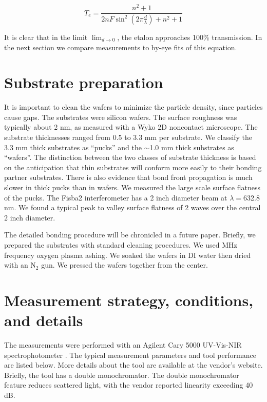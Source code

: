 \documentclass[osajnl,preprint,showpacs,superscriptaddress,12pt]{revtex4-1} %
\begin{document}
$$T_{e} = \frac{n^2+1}{2 n F \sin ^2(2\pi \frac{d}{\lambda})+n^2+1} \label{eqFP}$$


It is clear that in the limit $\lim_{d \rightarrow 0}$, the etalon approaches 100\% transmission.  In the next section we compare measurements to by-eye fits of this equation.


\section{Substrate preparation}
It is important to clean the wafers to minimize the particle density, since particles cause gaps.  The substrates were silicon wafers.  The surface roughness was typically about 2 nm, as measured with a Wyko 2D noncontact microscope.  The substrate thicknesses ranged from 0.5 to 3.3 mm per substrate.  We classify the 3.3 mm thick substrates as ``pucks'' and the $\sim$1.0 mm thick substrates as ``wafers''.  The distinction between the two classes of substrate thickness is based on the anticipation that thin substrates will conform more easily to their bonding partner substrates.  There is also evidence that bond front propagation is much slower in thick pucks \cite{2007ApOpt..46.6793H} than in wafers.  We measured the large scale surface flatness of the pucks.  The Fisba2 interferometer has a 2 inch diameter beam at $\lambda=$632.8 nm.  We found a typical peak to valley surface flatness of 2 waves over the central 2 inch diameter.


The detailed bonding procedure will be chronicled in a future paper.  Briefly, we prepared the substrates with standard cleaning procedures.  We used MHz frequency oxygen plasma ashing.  We soaked the wafers in DI water then dried with an N$_2$ gun.  We pressed the wafers together from the center.


\section{Measurement strategy, conditions, and details}
The measurements were performed with an Agilent Cary 5000 UV-Vis-NIR spectrophotometer \nocite{cary5000web}.  The typical measurement parameters and tool performance are listed below.  More details about the tool are available at the vendor's website.  Briefly, the tool has a double monochromator.  The double monochromator feature reduces scattered light, with the vendor reported linearity exceeding 40 dB.
\end{document}
